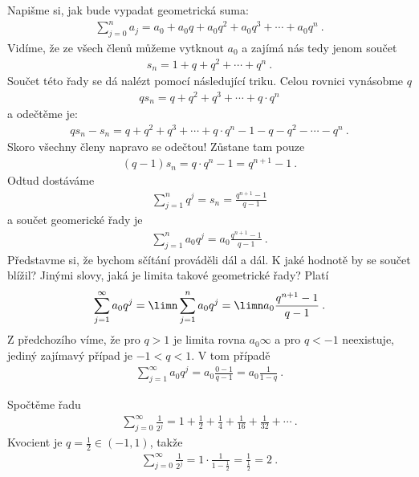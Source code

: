Napišme si, jak bude vypadat geometrická suma:
\begin{align}
    \sum_{j=0}^n a_j = a_0 + a_0 q + a_0 q^2 + a_0 q^3 + \cdots + a_0 q^n \:.
\end{align}
Vidíme, že ze všech členů můžeme vytknout $a_0$ a zajímá nás tedy jenom součet
\begin{align}
    s_n = 1 + q + q^2 + \cdots + q^n \:.
\end{align}
Součet této řady se dá nalézt pomocí následující triku. Celou rovnici vynásobme $q$
\begin{align}
    q s_n = q + q^2 + q^3 + \cdots + q \cdot q^n
\end{align}
a odečtěme je:
\begin{align}
    q s_n - s_n = q + q^2 + q^3 + \cdots + q \cdot q^n - 1 - q -q^2 - \cdots - q^n \:.
\end{align}
Skoro všechny členy napravo se odečtou! Zůstane tam pouze
\begin{align}
    (q-1) s_n =  q \cdot q^n - 1 = q^{n+1} - 1 \:.
\end{align}
Odtud dostáváme
\begin{align}
    \sum_{j=1}^n q^j = s_n = \frac{q^{n+1}-1}{q-1}
\end{align}
a součet geomerické řady je 
\begin{align}
    \sum_{j=1}^n a_0 q^j = a_0 \frac{q^{n+1}-1}{q-1} \:.
\end{align}
Představme si, že bychom sčítání prováděli dál a dál. K jaké hodnotě by se součet blížil? Jinými slovy, jaká je limita takové geometrické řady?
Platí \begin{align}
    \sum_{j=1}^\infty a_0 q^j = \limn \sum_{j=1}^n a_0 q^j = 
    \limn a_0 \frac{q^{n+1}-1}{q-1} \:.
\end{align}
Z předchozího víme, že pro $q>1$ je limita rovna $a_0 \infty$ a pro $q<-1$ neexistuje, jediný zajímavý případ je $-1<q<1$. V tom případě
\begin{align}
    \boxed{\sum_{j=1}^\infty a_0 q^j = a_0 \frac{0-1}{q-1} = a_0 \frac{1}{1-q}} \:.
\end{align}

\begin{example}
    Spočtěme řadu
    \begin{align}
        \sum_{j=0}^\infty \frac{1}{2^j} = 1 + \frac{1}{2} + \frac{1}{4} + \frac{1}{16} + \frac{1}{32} + \cdots \:.
    \end{align}
    Kvocient je $q = \frac{1}{2} \in (-1,1)$, takže
    \begin{align}
        \sum_{j=0}^\infty \frac{1}{2^j} = 1 \cdot \frac{1}{1-\frac{1}{2}} = \frac{1}{\frac{1}{2}} = 2 \:.
    \end{align}
\end{example}
